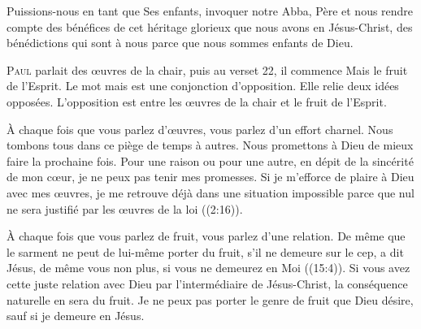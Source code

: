Puissions-nous en tant que Ses enfants, invoquer notre Abba,
 Père et nous rendre compte des bénéfices de cet héritage glorieux
 que nous avons en Jésus-Christ, des bénédictions qui sont à nous
 parce que nous sommes enfants de Dieu. 

\dvrule







\lettrine{P}{aul} parlait des \oe{}uvres de la chair,
 puis au verset 22, il commence\frcolon {}
 \Og Mais le fruit de l'Esprit. \Fg{}
 Le mot \Og mais \Fg{} est une conjonction d'opposition.
 Elle relie deux idées opposées.
 L'opposition est entre les \oe{}uvres de la chair et le fruit de l'Esprit.

À chaque fois que vous parlez d'\oe{}uvres, vous parlez d'un effort charnel.
 Nous tombons tous dans ce piège de temps à autres. Nous promettons à Dieu
 de mieux faire la prochaine fois. Pour une raison ou pour une autre,
 en dépit de la sincérité de mon c\oe{}ur, je ne peux pas tenir mes promesses.
 Si je m'efforce de plaire à Dieu avec mes \oe{}uvres, je me retrouve déjà
 dans une situation impossible parce que 
 \Og nul ne sera justifié par les \oe{}uvres de la loi \Fg{}
 ((2:16)). 



À chaque fois que vous parlez de fruit, vous parlez d'une relation.
 \Og De même que le sarment ne peut de lui-même porter du fruit,
 s'il ne demeure sur le cep, a dit Jésus, 
 de même vous non plus, si vous ne demeurez en Moi \Fg{}
 ((15:4)).
 Si vous avez cette juste relation avec Dieu par l'intermédiaire de Jésus-Christ,
 la conséquence naturelle en sera du fruit. Je ne peux pas porter
 le genre de fruit que Dieu désire, sauf si je demeure en Jésus.

